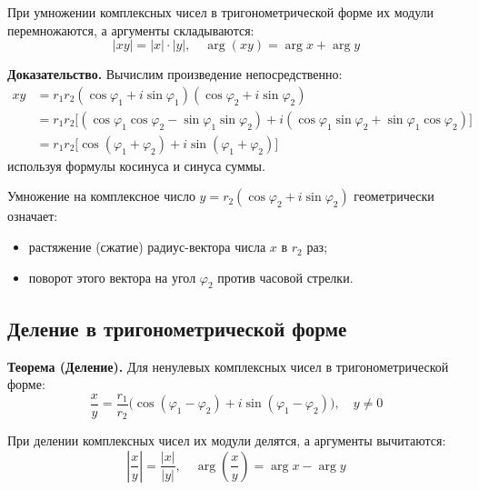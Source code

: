 \documentclass[a4paper,12pt]{article}
\theoremstyle{definition}
\theoremstyle{plain}
\theoremstyle{remark}
\begin{document}
	\begin{tcolorbox}[colback=red!5, colframe=red!70!black, title=Правило умножения]
		При умножении комплексных чисел в тригонометрической форме их модули перемножаются, а аргументы складываются:
		\[
		|xy| = |x| \cdot |y|,\quad \arg(xy) = \arg x + \arg y
		\]
	\end{tcolorbox}
	
	\medskip
	\noindent \textbf{Доказательство.}
	Вычислим произведение непосредственно:
	\[
	\begin{aligned}
		xy &= r_1 r_2 (\cos \varphi_1 + i \sin \varphi_1)(\cos \varphi_2 + i \sin \varphi_2) \\
		&= r_1 r_2 \bigl[(\cos \varphi_1 \cos \varphi_2 - \sin \varphi_1 \sin \varphi_2) + i(\cos \varphi_1 \sin \varphi_2 + \sin \varphi_1 \cos \varphi_2)\bigr] \\
		&= r_1 r_2 \bigl[\cos(\varphi_1 + \varphi_2) + i \sin(\varphi_1 + \varphi_2)\bigr]
	\end{aligned}
	\]
	используя формулы косинуса и синуса суммы.
	
	\begin{tcolorbox}[colback=blue!5, colframe=blue!40!black, title=Геометрический смысл]
		Умножение на комплексное число $y = r_2(\cos \varphi_2 + i \sin \varphi_2)$ геометрически означает:
		\begin{itemize}
			\item растяжение (сжатие) радиус-вектора числа $x$ в $r_2$ раз;
			\item поворот этого вектора на угол $\varphi_2$ против часовой стрелки.
		\end{itemize}
	\end{tcolorbox}
	
	\subsection{Деление в тригонометрической форме}
	
	\noindent \textbf{Теорема (Деление).}
	Для ненулевых комплексных чисел в тригонометрической форме:
	\[
	\frac{x}{y} = \frac{r_1}{r_2} \bigl(\cos(\varphi_1 - \varphi_2) + i \sin(\varphi_1 - \varphi_2)\bigr),\quad y \neq 0
	\]
	
	\begin{tcolorbox}[colback=red!5, colframe=red!70!black, title=Правило деления]
		При делении комплексных чисел их модули делятся, а аргументы вычитаются:
		\[
		\left|\frac{x}{y}\right| = \frac{|x|}{|y|},\quad \arg\left(\frac{x}{y}\right) = \arg x - \arg y
		\]
	\end{tcolorbox}
	
\end{document}
